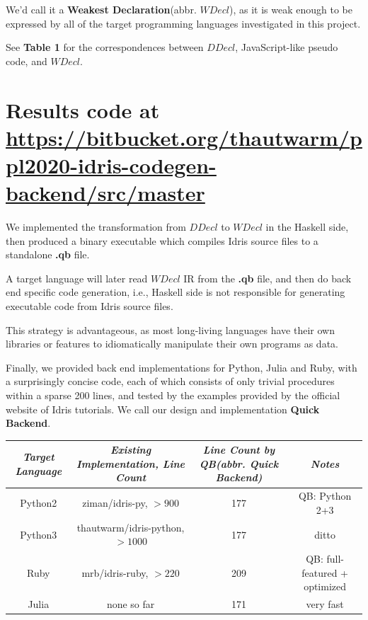 \documentclass[a1,portrait]{a1poster}
\begin{document}
\begin{multicols}{2}
We'd call it a \textbf{Weakest Declaration}(abbr. $WDecl$), as it is weak enough to be expressed by
all of the target programming languages investigated in this project.

See \textbf{Table 1} for the correspondences between $DDecl$, JavaScript-like pseudo code, and $WDecl$.

\color{FireBrick} %

\section*{Results \small code at {\url{https://bitbucket.org/thautwarm/ppl2020-idris-codegen-backend/src/master}}}

We implemented the transformation from $DDecl$ to $WDecl$ in the Haskell side,
then produced a binary executable which compiles Idris source files to a standalone \textbf{.qb} file.

A target language will later read $WDecl$ IR from the \textbf{.qb} file,
and then do back end specific code generation, i.e., Haskell side
is not responsible for generating executable code from Idris source files.

This strategy is advantageous,
as most long-living languages have their own libraries or features
to idiomatically manipulate their own programs as data.

Finally, we provided back end implementations for Python, Julia and Ruby,
with a surprisingly concise code, each of which consists of only
trivial procedures within a sparse 200 lines,
and tested by the examples provided by the official website of Idris tutorials.
We call our design and implementation \textbf{Quick Backend}.

\begin{center}
\begin{tabular}{ |c|c|c|c } 
 \toprule
 \textit{Target Language} & \textit{Existing Implementation, Line Count} & \textit{Line Count by QB(abbr. Quick Backend)} & \textit{Notes} \\
 \midrule
 Python2 & ziman/idris-py, $> 900$ & 177 & QB: Python 2+3 \\
 Python3 & thautwarm/idris-python, $> 1000$ & 177 & ditto \\
 Ruby & mrb/idris-ruby, $> 220 $ &  209 & QB: full-featured + optimized \\
 Julia & none so far & 171 & very fast \\
 \bottomrule
\end{tabular}
\end{center}


\end{multicols}
\end{document}

